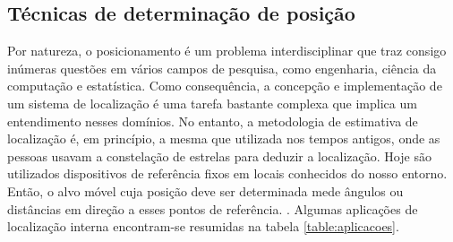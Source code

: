 \subsection{Técnicas de determinação de posição}\label{sec:determ-posic}
Por natureza, o posicionamento é um problema interdisciplinar que traz consigo inúmeras questões em vários campos de pesquisa, como engenharia, ciência da computação e estatística. Como consequência, a concepção e implementação de um sistema de localização é uma tarefa bastante complexa que implica um entendimento nesses domínios. No entanto, a metodologia de estimativa de localização é, em princípio, a mesma que utilizada nos tempos antigos, onde as pessoas usavam a constelação de estrelas para deduzir a localização. Hoje são utilizados dispositivos de referência fixos em locais conhecidos do nosso entorno. Então, o alvo móvel cuja posição deve ser determinada mede ângulos ou distâncias em direção a esses pontos de referência. \cite{linde2006aspects}. Algumas aplicações de localização interna encontram-se resumidas na tabela \ref{table:aplicacoes}.

